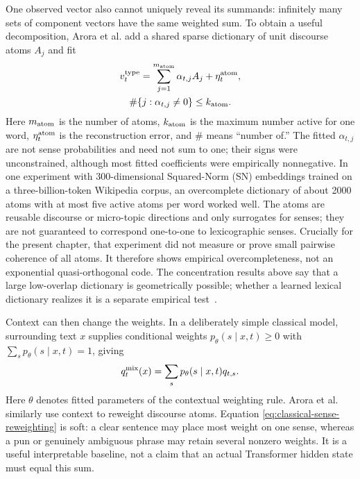 \documentclass[
  aps,
  reprint,
  superscriptaddress,
  floatfix,
  nofootinbib,
  longbibliography
]{revtex4-2}
\begin{document}
One observed vector also cannot uniquely reveal its summands: infinitely many
sets of component vectors have the same weighted sum.  To obtain a useful
decomposition, Arora et al. add a shared sparse dictionary of unit discourse
atoms $A_j$ and fit
%
\begin{multline}
\label{eq:arora-atoms}
v_t^{\rm type}=\sum_{j=1}^{m_{\rm atom}}\alpha_{t,j}A_j
+\eta_t^{\rm atom},\\
\#\{j:\alpha_{t,j}\ne0\}\leq k_{\rm atom}.
\end{multline}
%
Here $m_{\rm atom}$ is the number of atoms, $k_{\rm atom}$ is the maximum
number active for one word, $\eta_t^{\rm atom}$ is the reconstruction error,
and $\#$ means ``number of.''  The fitted $\alpha_{t,j}$ are not sense
probabilities and need not sum to one; their signs were unconstrained, although
most fitted coefficients were empirically nonnegative.  In one experiment
with 300-dimensional Squared-Norm (SN) embeddings trained on a
three-billion-token Wikipedia corpus, an overcomplete
dictionary of about 2000 atoms with at most five active atoms per word worked
well.  The atoms are reusable discourse or micro-topic directions and only
surrogates for senses; they are not guaranteed to correspond one-to-one to
lexicographic senses.  Crucially for the present chapter, that experiment did
not measure or prove small pairwise coherence of all atoms.  It therefore
shows empirical overcompleteness, not an exponential quasi-orthogonal code.
The concentration results above say that a large low-overlap dictionary is
geometrically possible; whether a learned lexical dictionary realizes it is a
separate empirical test~\cite{arora-etal-2018-linear}.

Context can then change the weights.  In a deliberately simple classical
model, surrounding text $x$ supplies conditional weights
$p_\theta(s\mid x,t)\geq0$ with $\sum_s p_\theta(s\mid x,t)=1$, giving
%
\begin{equation}
\label{eq:classical-sense-reweighting}
q_t^{\rm mix}(x)=\sum_s p_\theta(s\mid x,t)q_{t,s}.
\end{equation}
%
Here $\theta$ denotes fitted parameters of the contextual weighting rule.
Arora et al. similarly use context to reweight discourse atoms.  Equation
\eqref{eq:classical-sense-reweighting} is soft: a clear sentence may place most
weight on one sense, whereas a pun or genuinely ambiguous phrase may retain
several nonzero weights.  It is a useful interpretable baseline, not a claim
that an actual Transformer hidden state must equal this sum.
\end{document}
